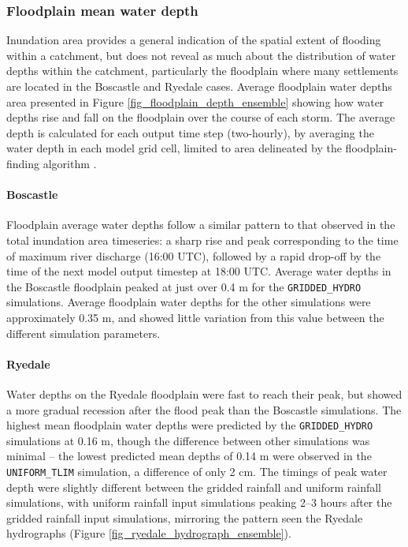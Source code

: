 \subsubsection{Floodplain mean water depth}

Inundation area provides a general indication of the spatial extent of flooding within a catchment, but does not reveal as much about the distribution of water depths within the catchment, particularly the floodplain where many settlements are located in the Boscastle and Ryedale cases. Average floodplain water depths area presented in Figure \ref{fig_floodplain_depth_ensemble} showing how water depths rise and fall on the floodplain over the course of each storm. The average depth is calculated for each output time step (two-hourly), by averaging the water depth in each model grid cell, limited to area delineated by the floodplain-finding algorithm \citep{clubbinpress}. 

\paragraph{Boscastle}
Floodplain average water depths follow a similar pattern to that observed in the total inundation area timeseries: a sharp rise and peak corresponding to the time of maximum river discharge (16:00 UTC), followed by a rapid drop-off by the time of the next model output timestep at 18:00 UTC. Average water depths in the Boscastle floodplain peaked at just over 0.4 m for the \texttt{GRIDDED\_HYDRO} simulations. Average floodplain water depths for the other simulations were approximately 0.35 m, and showed little variation from this value between the different simulation parameters. %

\paragraph{Ryedale}
Water depths on the Ryedale floodplain were fast to reach their peak, but showed a more gradual recession after the flood peak than the Boscastle simulations. The highest mean floodplain water depths were predicted by the \texttt{GRIDDED\_HYDRO} simulations at 0.16 m, though the difference between other simulations was minimal -- the lowest predicted mean depths of 0.14 m were observed in the \texttt{UNIFORM\_TLIM} simulation, a difference of only 2 cm. The timings of peak water depth were slightly different between the gridded rainfall and uniform rainfall simulations, with uniform rainfall input simulations peaking 2--3 hours after the gridded rainfall input simulations, mirroring the pattern seen the Ryedale hydrographs (Figure \ref{fig_ryedale_hydrograph_ensemble}).

